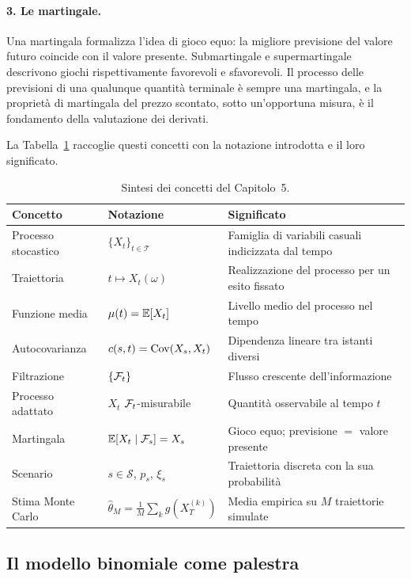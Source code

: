 \paragraph{3. Le martingale.}
Una martingala formalizza l'idea di gioco equo: la migliore previsione
del valore futuro coincide con il valore presente. Submartingale e
supermartingale descrivono giochi rispettivamente favorevoli e
sfavorevoli. Il processo delle previsioni di una qualunque quantit\`{a}
terminale \`{e} sempre una martingala, e la propriet\`{a} di martingala
del prezzo scontato, sotto un'opportuna misura, \`{e} il fondamento
della valutazione dei derivati.

La Tabella~\ref{tab:sintesi-cap5} raccoglie questi concetti con la
notazione introdotta e il loro significato.

\begin{table}[ht]
\centering
\begin{tabular}{|p{2.5cm}|p{3.8cm}|p{4.5cm}|}
\hline
\textbf{Concetto} & \textbf{Notazione} & \textbf{Significato}\\
\hline
Processo stocastico & $\{X_t\}_{t\in\mathcal{T}}$ &
Famiglia di variabili casuali indicizzata dal tempo\\
\hline
Traiettoria & $t\mapsto X_t(\omega)$ &
Realizzazione del processo per un esito fissato\\
\hline
Funzione media & $\mu(t)=\mathbb{E}[X_t]$ &
Livello medio del processo nel tempo\\
\hline
Autocovarianza & $c(s,t)=\operatorname{Cov}(X_s,X_t)$ &
Dipendenza lineare tra istanti diversi\\
\hline
Filtrazione & $\{\mathcal{F}_t\}$ &
Flusso crescente dell'informazione\\
\hline
Processo adattato & $X_t$ $\mathcal{F}_t$-misurabile &
Quantit\`{a} osservabile al tempo $t$\\
\hline
Martingala & $\mathbb{E}[X_t\mid\mathcal{F}_s]=X_s$ &
Gioco equo; previsione $=$ valore presente\\
\hline
Scenario & $s\in\mathcal{S}$, $p_s$, $\xi_s$ &
Traiettoria discreta con la sua probabilit\`{a}\\
\hline
Stima Monte Carlo &
$\widehat{\theta}_M=\frac{1}{M}\sum_k g(X_T^{(k)})$ &
Media empirica su $M$ traiettorie simulate\\
\hline
\end{tabular}
\caption{Sintesi dei concetti del Capitolo~5.}
\label{tab:sintesi-cap5}
\end{table}

\subsection{Il modello binomiale come palestra}

